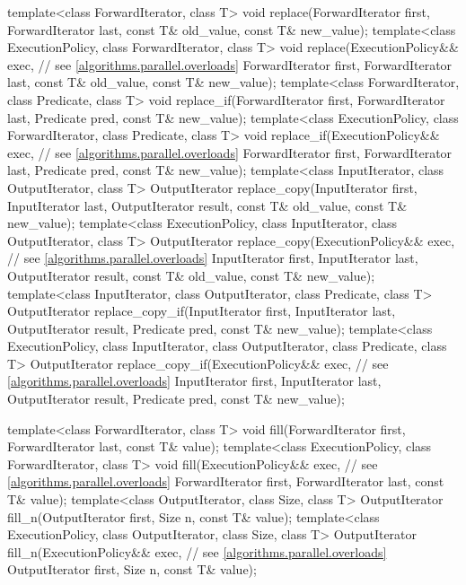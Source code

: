 \begin{codeblock}
{  template<class ForwardIterator, class T>
    void replace(ForwardIterator first, ForwardIterator last,
                 const T& old_value, const T& new_value);
  template<class ExecutionPolicy, class ForwardIterator, class T>
    void replace(ExecutionPolicy&& exec, // see \ref{algorithms.parallel.overloads}
                 ForwardIterator first, ForwardIterator last,
                 const T& old_value, const T& new_value);
  template<class ForwardIterator, class Predicate, class T>
    void replace_if(ForwardIterator first, ForwardIterator last,
                    Predicate pred, const T& new_value);
  template<class ExecutionPolicy, class ForwardIterator, class Predicate, class T>
    void replace_if(ExecutionPolicy&& exec, // see \ref{algorithms.parallel.overloads}
                    ForwardIterator first, ForwardIterator last,
                    Predicate pred, const T& new_value);
  template<class InputIterator, class OutputIterator, class T>
    OutputIterator replace_copy(InputIterator first, InputIterator last,
                                OutputIterator result,
                                const T& old_value, const T& new_value);
  template<class ExecutionPolicy, class InputIterator, class OutputIterator, class T>
    OutputIterator replace_copy(ExecutionPolicy&& exec, // see \ref{algorithms.parallel.overloads}
                                InputIterator first, InputIterator last,
                                OutputIterator result,
                                const T& old_value, const T& new_value);
  template<class InputIterator, class OutputIterator, class Predicate, class T>
    OutputIterator replace_copy_if(InputIterator first, InputIterator last,
                                   OutputIterator result,
                                   Predicate pred, const T& new_value);
  template<class ExecutionPolicy, class InputIterator, class OutputIterator,
           class Predicate, class T>
    OutputIterator replace_copy_if(ExecutionPolicy&& exec, // see \ref{algorithms.parallel.overloads}
                                   InputIterator first, InputIterator last,
                                   OutputIterator result,
                                   Predicate pred, const T& new_value);

  template<class ForwardIterator, class T>
    void fill(ForwardIterator first, ForwardIterator last, const T& value);
  template<class ExecutionPolicy, class ForwardIterator,
           class T>
    void fill(ExecutionPolicy&& exec, // see \ref{algorithms.parallel.overloads}
              ForwardIterator first, ForwardIterator last, const T& value);
  template<class OutputIterator, class Size, class T>
    OutputIterator fill_n(OutputIterator first, Size n, const T& value);
  template<class ExecutionPolicy, class OutputIterator,
           class Size, class T>
    OutputIterator fill_n(ExecutionPolicy&& exec, // see \ref{algorithms.parallel.overloads}
                          OutputIterator first, Size n, const T& value);

}
\end{codeblock}
